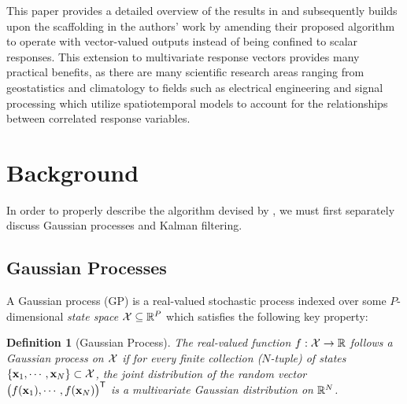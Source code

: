 \documentclass[10pt]{article}
\newtheorem{definition}{Definition}[section]
\numberwithin{equation}{section}
\begin{document}
This paper provides a detailed overview of the results in \citet{Todescato-Efficient-2020} and subsequently builds upon the scaffolding in the authors' work by amending their proposed algorithm to operate with vector-valued outputs instead of being confined to scalar responses. This extension to multivariate response vectors provides many practical benefits, as there are many scientific research areas ranging from geostatistics and climatology to fields such as electrical engineering and signal processing \citep{Sarkka-Spatial-Kalman-2012,Huang-Nonstationary-2025} which utilize spatiotemporal models to account for the relationships between correlated response variables.

\section{Background}
\label{sec:background}

In order to properly describe the algorithm devised by \citet{Todescato-Efficient-2020}, we must first separately discuss Gaussian processes and Kalman filtering.

\subsection{Gaussian Processes}
\label{subsec:intro-GP}

A Gaussian process (GP) is a real-valued stochastic process indexed over some $P$-dimensional \emph{state space} $\mathcal{X} \subseteq \mathbb{R}^{P}$ which satisfies the following key property:

\begin{definition}[Gaussian Process]
\label{def:GP}
    The real-valued function $f: \mathcal{X} \to \mathbb{R}$ follows a Gaussian process on $\mathcal{X}$ if for every finite collection ($N$-tuple) of states $\{\mathbf{x}_{1}, \cdots, \mathbf{x}_{N}\} \subset \mathcal{X}$, the joint distribution of the random vector $\big(f(\mathbf{x}_{1}), \cdots, f(\mathbf{x}_{N})\big)^{\scriptstyle{\mathsf{T}}}$ is a multivariate Gaussian distribution on $\mathbb{R}^{N}$. 
\end{definition}
\end{document}
